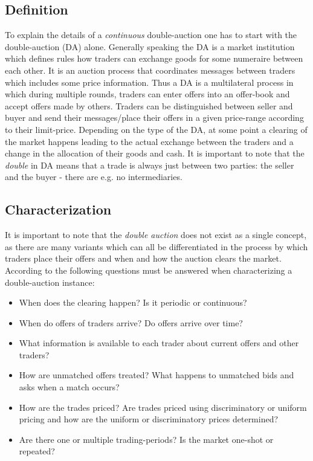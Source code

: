\documentclass[../Bachelorarbeit.tex]{subfiles}
\begin{document}
\subsection{Definition}
To explain the details of a \textit{continuous} double-auction one has to start with the double-auction (DA) alone. Generally speaking the DA is a \gls{market institution} which defines rules how traders can exchange \glspl{good} for some \gls{numeraire} between each other. It is an \gls{auction} process that coordinates messages between traders which includes some price information. Thus a DA is a multilateral process in which during multiple \glspl{round}, traders can enter \glspl{offer} into an \gls{offer-book} and accept offers made by others. Traders can be distinguished between \gls{seller} and \gls{buyer} and send their messages/place their offers in a given price-range according to their \gls{limit-price}. Depending on the type of the DA, at some point a \gls{clearing} of the market happens leading to the actual exchange between the traders and a change in the allocation of their goods and cash. It is important to note that the \textit{double} in DA means that a trade is always just between two parties: the seller and the buyer - there are e.g. no intermediaries. \cite{Parsons2006}

\subsection{Characterization}
It is important to note that the \textit{double auction} does not exist as a single concept, as there are many variants which can all be differentiated in the process by which traders place their offers and when and how the auction clears the market. According to \cite{Parsons2006} the following questions must be answered when characterizing a double-auction instance:

\begin{itemize}
\item When does the clearing happen? Is it periodic or continuous?
\item When do offers of traders arrive? Do offers arrive over time?
\item What information is available to each trader about current offers and other traders?
\item How are unmatched offers treated? What happens to unmatched bids and asks when a match occurs?
\item How are the trades priced? Are trades priced using discriminatory or uniform pricing and how are the uniform or discriminatory prices determined?
\item Are there one or multiple trading-periods? Is the market one-shot or repeated?
\end{itemize}
\end{document}
